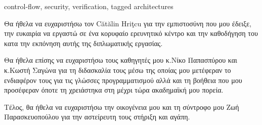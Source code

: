 \begin{keywordseng}
control-flow, security, verification, tagged architectures
\end{keywordseng}




\begin{acknowledgements}

Θα ήθελα να ευχαριστήσω τον C\u{a}t\u{a}lin Hri\c{t}cu για την εμπιστοσύνη που μου έδειξε, την ευκαιρία να εργαστώ σε
ένα κορυφαίο ερευνητικό κέντρο και την καθοδήγηση του κατα την εκπόνηση αυτής της διπλωματικής εργασίας. 

Θα ήθελα επίσης να ευχαριστήσω τους καθηγητές μου κ.Νίκο Παπασπύρου και κ.Κωστή Σαγώνα για τη διδασκαλία τους μέσω
της οποίας μου μετέφεραν το ενδιαφέρον τους για τις γλώσσες προγραμματισμού αλλά και τη βοήθεια που μου
προσέφεραν όποτε τη χρειάστηκα στη μέχρι τώρα ακαδημαϊκή μου πορεία.

Τέλος, θα ήθελα να ευχαριστήσω την οικογένεια μου και τη σύντροφο μου
Ζωή Παρασκευοπούλου για την αστείρευτη τους στήριξη και αγάπη.
\end{acknowledgements}
